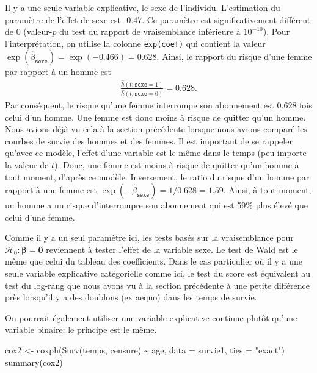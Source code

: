 \documentclass[
  11pt,
  letterpaper,
]{book}
\newenvironment{Shaded}{\begin{snugshade}}{\end{snugshade}}
\newcommand{\AttributeTok}[1]{\textcolor[rgb]{0.40,0.45,0.13}{#1}}
\newcommand{\FunctionTok}[1]{\textcolor[rgb]{0.28,0.35,0.67}{#1}}
\newcommand{\NormalTok}[1]{\textcolor[rgb]{0.00,0.23,0.31}{#1}}
\newcommand{\OtherTok}[1]{\textcolor[rgb]{0.00,0.23,0.31}{#1}}
\newcommand{\SpecialCharTok}[1]{\textcolor[rgb]{0.37,0.37,0.37}{#1}}
\newcommand{\StringTok}[1]{\textcolor[rgb]{0.13,0.47,0.30}{#1}}
\theoremstyle{definition}
\theoremstyle{remark}
\begin{document}
Il y a une seule variable explicative, le sexe de l'individu.
L'estimation du paramètre de l'effet de sexe est -0.47. Ce paramètre est
significativement différent de \(0\) (valeur-\(p\) du test du rapport de
vraisemblance inférieure à \(10^{-10}\)). Pour l'interprétation, on
utilise la colonne \texttt{exp(coef)} qui contient la valeur
\(\exp(\hat{\beta}_{\texttt{sexe}}) = \exp(-0.466) = 0.628\). Ainsi, le
rapport du risque d'une femme par rapport à un homme est \begin{align*}
 \frac{\hat{h}(t; \texttt{sexe}=1)}{\hat{h}(t; \texttt{sexe}=0)}= 0.628.
\end{align*} Par conséquent, le risque qu'une femme interrompe son
abonnement est 0.628 fois celui d'un homme. Une femme est donc moins à
risque de quitter qu'un homme. Nous avions déjà vu cela à la section
précédente lorsque nous avions comparé les courbes de survie des hommes
et des femmes. Il est important de se rappeler qu'avec ce modèle,
l'effet d'une variable est le même dans le temps (peu importe la valeur
de \(t\)). Donc, une femme est moins à risque de quitter qu'un homme à
tout moment, d'après ce modèle. Inversement, le ratio du risque d'un
homme par rapport à une femme est
\(\exp(-\hat{\beta}_{\texttt{sexe}}) = 1/0.628=1.59\). Ainsi, à tout
moment, un homme a un risque d'interrompre son abonnement qui est 59\%
plus élevé que celui d'une femme.

Comme il y a un seul paramètre ici, les tests basés sur la vraisemblance
pour \(\mathscr{H}_0: \boldsymbol{\beta}=\boldsymbol{0}\) reviennent à
tester l'effet de la variable sexe. Le test de Wald est le même que
celui du tableau des coefficients. Dans le cas particulier où il y a une
seule variable explicative catégorielle comme ici, le test du score est
équivalent au test du log-rang que nous avons vu à la section précédente
à une petite différence près lorsqu'il y a des doublons (ex aequo) dans
les temps de survie.

On pourrait également utiliser une variable explicative continue plutôt
qu'une variable binaire; le principe est le même.

\begin{Shaded}
\begin{Highlighting}[]
\NormalTok{cox2 }\OtherTok{\textless{}{-}} \FunctionTok{coxph}\NormalTok{(}\FunctionTok{Surv}\NormalTok{(temps, censure) }\SpecialCharTok{\textasciitilde{}}\NormalTok{ age, }
              \AttributeTok{data =}\NormalTok{ survie1,}
              \AttributeTok{ties =} \StringTok{"exact"}\NormalTok{)}
\FunctionTok{summary}\NormalTok{(cox2)}
\end{Highlighting}
\end{Shaded}
\end{document}

